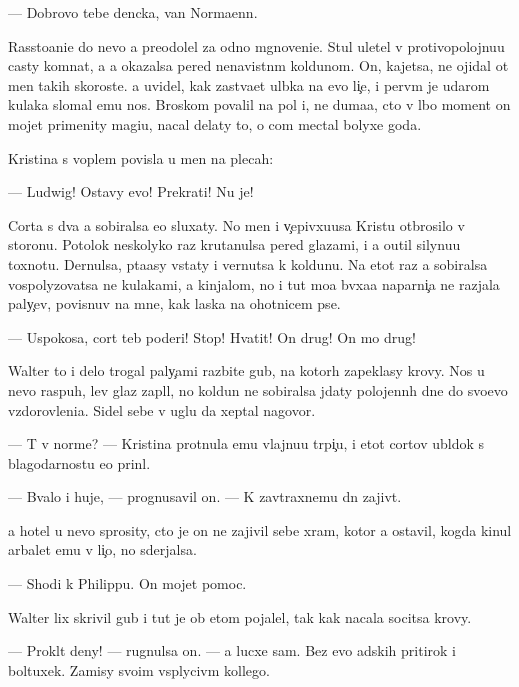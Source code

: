 \documentclass[10pt]{book}
\begin{document}
— Dobrovo tebe den{\e}cka, van Normaenn.

Rassto{\y}ani{\y}e do nevo {\y}a preodolel za odno mgnoveni{\y}e. Stul uletel v pro\-ti\-vo\-po\-loj\-nu\-{\y}u casty komnat{\yi}, a {\y}a okazalsa pered nenavistn{\yi}m koldunom. On, kajetsa, ne ojidal ot men{\ia} takih skoroste{\y}. {\Y}a uvidel, kak zast{\yi}va{\y}et ul{\yi}bka na {\y}evo li{\c}e, i perv{\yi}m je udarom kulaka slomal {\y}emu nos. Broskom povalil na pol i, ne duma{\y}a, cto v l{\io}bo{\y} moment on mojet primenity magi{\y}u, nacal delaty to, o com mectal bolyxe goda.

Kristina s voplem povisla u men{\ia} na plecah:

— Ludwig! Ostavy {\y}evo! Prekrati! Nu je!

Corta s dva {\y}a sobiralsa {\y}e{\y}o sluxaty. No men{\ia} i v{\c}epivxu{\y}usa Kristu otbrosilo v storonu. Potolok neskolyko raz krutanulsa pered glaza\-mi, i {\y}a o{\x}util silynu{\y}u toxnotu. Dernulsa, p{\yi}ta{\y}asy vstaty i vernutsa k koldunu. Na etot raz {\y}a sobiralsa vospolyzovatsa ne kulakami, a kinjalom, no i tut mo{\y}a b{\yi}vxa{\y}a naparni{\c}a ne razjala paly{\c}ev, povisnuv na mne, kak laska na ohotnic{\y}em pse.

— Uspoko{\y}sa, cort teb{\ia} poderi! Stop! Hvatit! On drug! On mo{\y} drug!



Walter to i delo trogal paly{\c}ami razbit{\yi}{\y}e gub{\yi}, na kotor{\yi}h zapeklasy krovy. Nos u nevo raspuh, lev{\yi}{\y} glaz zapl{\yi}l, no koldun ne sobiralsa jdaty polojenn{\yi}h dne{\y} do svo{\y}evo v{\yi}zdorovleni{\y}a. Sidel sebe v uglu da xeptal nagovor{\yi}.

— T{\yi} v norme? — Kristina pro\-t{\ia}\-nu\-la {\y}emu vlajnu{\y}u tr{\ia}pi{\c}u, i etot cortov ubl{\io}\-dok s blagodarnost{\y}u {\y}e{\y}o prin{\ia}l.

— B{\yi}valo i huje, — prognusavil on. — K zavtraxnemu dn{\io} zajiv{\e}t.

{\Y}a hotel u nevo sprosity, cto je on ne zajivil sebe xram, kotor{\yi}{\y} {\y}a ostavil, kogda kinul arbalet {\y}emu v li{\c}o, no sderjalsa.

— Shodi k Philippu. On mojet pomoc.

Walter lix skrivil gub{\yi} i tut je ob etom pojalel, tak kak nacala socitsa krovy.

— Prokl{\ia}t{\yi}{\y} deny! — rugnulsa on. — {\Y}a lucxe sam. Bez {\y}evo adskih pritirok i boltuxek. Za{\y}misy svo{\y}im vsp{\yi}lyciv{\yi}m kollego{\y}.
\end{document}

